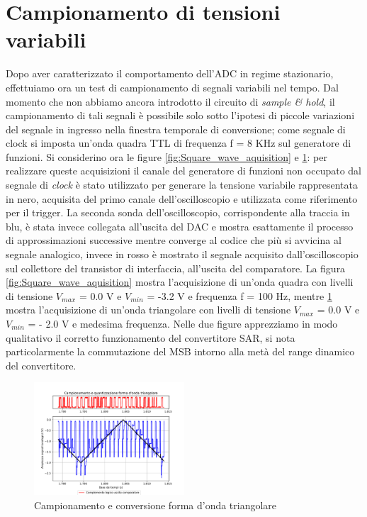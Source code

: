 \documentclass[journal]{IEEEtran}
\begin{document}
\section{Campionamento di tensioni variabili}
Dopo aver caratterizzato il comportamento dell'ADC in regime stazionario, effettuiamo ora un test di campionamento di segnali variabili nel tempo. Dal momento che non abbiamo ancora introdotto il circuito di \textit{sample \& hold}, il campionamento di tali segnali è possibile solo sotto l'ipotesi di piccole variazioni del segnale in ingresso nella finestra temporale di conversione; come segnale di clock si imposta un'onda quadra TTL di frequenza f = 8 KHz sul generatore di funzioni. Si considerino ora le figure \ref{fig:Square_wave_aquisition} e \ref{fig:Triangular_wave_aquisition}: per realizzare queste acquisizioni il canale del generatore di funzioni non occupato dal segnale di \textit{clock} è stato utilizzato per generare la tensione variabile rappresentata in nero, acquisita del primo canale dell'oscilloscopio e utilizzata come riferimento per il trigger. La seconda sonda dell'oscilloscopio, corrispondente alla traccia in blu, è stata invece collegata all'uscita del DAC e mostra esattamente il processo di approssimazioni successive mentre converge al codice che più si avvicina al segnale analogico, invece in rosso è mostrato il segnale acquisito dall'oscilloscopio sul collettore del transistor di interfaccia, all'uscita del comparatore. La figura \ref{fig:Square_wave_aquisition} mostra l'acquisizione di un'onda quadra con livelli di tensione $V_{max}$ = 0.0 V e $V_{min}$ = -3.2 V e frequenza f = 100 Hz, mentre \ref{fig:Triangular_wave_aquisition} mostra l'acquisizione di un'onda triangolare con livelli di tensione $V_{max}$ = 0.0 V e $V_{min}$ = - 2.0 V e medesima frequenza. Nelle due figure apprezziamo in modo qualitativo il corretto funzionamento del convertitore SAR, si nota particolarmente la commutazione del MSB intorno alla metà del range dinamico del convertitore.


\begin{figure}[H]%
\begin{center}
\includegraphics[trim = {0 25 0 0},clip, width=0.50\textwidth]{analysis/output/triangle_wave_aq.pdf}
\caption{Campionamento e conversione forma d'onda triangolare}
\label{fig:Triangular_wave_aquisition}
\end{center}
\end{figure}
\end{document}
